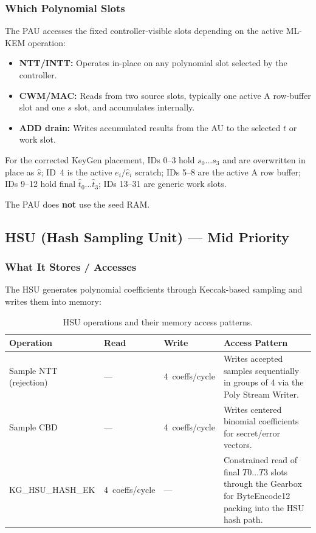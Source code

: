 \documentclass[11pt,letterpaper]{article}
\begin{document}
\subsubsection{Which Polynomial Slots}

The PAU accesses the fixed controller-visible slots depending on the active
ML-KEM operation:

\begin{itemize}
  \item \textbf{NTT/INTT:} Operates in-place on any polynomial slot
    selected by the controller.
  \item \textbf{CWM/MAC:} Reads from two source slots, typically one
    active A row-buffer slot and one $s$ slot, and accumulates internally.
  \item \textbf{ADD drain:} Writes accumulated results from the AU to
    the selected $t$ or work slot.
\end{itemize}

For the corrected KeyGen placement, IDs 0--3 hold $s_0\ldots s_3$ and
are overwritten in place as $\hat{s}$; ID~4 is the active $e_i/\hat{e}_i$
scratch; IDs 5--8 are the active A row buffer; IDs 9--12 hold final
$\hat{t}_0\ldots\hat{t}_3$; IDs 13--31 are generic work slots.

The PAU does \textbf{not} use the seed RAM.

\subsection{HSU (Hash Sampling Unit) — Mid Priority}

\subsubsection{What It Stores / Accesses}

The HSU generates polynomial coefficients through Keccak-based sampling
and writes them into memory:

\begin{table}[H]
\centering
\caption{HSU operations and their memory access patterns.}
\label{tab:hsu_ops}
\begin{tabular}{@{}lllp{5.5cm}@{}}
\toprule
\textbf{Operation} & \textbf{Read} & \textbf{Write} &
\textbf{Access Pattern} \\
\midrule
Sample NTT (rejection) & --- & 4~coeffs/cycle &
  Writes accepted samples sequentially in groups of 4
  via the Poly Stream Writer. \\
Sample CBD & --- & 4~coeffs/cycle &
  Writes centered binomial coefficients for secret/error
  vectors. \\
KG\_HSU\_HASH\_EK & 4~coeffs/cycle & --- &
  Constrained read of final $T0\ldots T3$ slots through the Gearbox
  for ByteEncode12 packing into the HSU hash path. \\
\bottomrule
\end{tabular}
\end{table}
\end{document}
